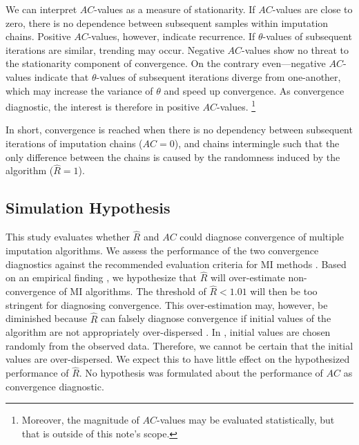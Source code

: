 \documentclass[article]{jss}
\begin{document}
We can interpret $AC$-values as a measure of stationarity. If $AC$-values are close to zero, there is no dependence between subsequent samples within imputation chains. Positive $AC$-values, however, indicate recurrence. If $\theta$-values of subsequent iterations are similar, trending may occur. Negative $AC$-values show no threat to the stationarity component of convergence. On the contrary even---negative $AC$-values indicate that $\theta$-values of subsequent iterations diverge from one-another, which may increase the variance of $\theta$ and speed up convergence. As convergence diagnostic, the interest is therefore in positive $AC$-values. 
\footnote{Moreover, the magnitude of $AC$-values may be evaluated statistically, but that is outside of this note's scope.}

In short, convergence is reached when there is no dependency between subsequent iterations of imputation chains ($AC = 0$), and chains intermingle such that the only difference between the chains is caused by the randomness induced by the algorithm ($\widehat{R} = 1$).

\subsection{Simulation Hypothesis} \label{sec:hypothesis}

This study evaluates whether $\widehat{R}$ and $AC$ could diagnose convergence of multiple imputation algorithms. We assess the performance of the two convergence diagnostics against the recommended evaluation criteria for MI methods \citep[i.e., average bias, average confidence interval width, and empirical coverage rate across simulations;][\S~2.5.2]{buur18}. %
Based on an empirical finding \citep{lace07}, we hypothesize that $\widehat{R}$ will over-estimate non-convergence of MI algorithms. The threshold of $\widehat{R} < 1.01$ will then be too stringent for diagnosing convergence. This over-estimation may, however, be diminished because $\widehat{R}$ can falsely diagnose convergence if initial values of the algorithm are not appropriately over-dispersed \cite[p~437]{broo98}. In , initial values are chosen randomly from the observed data. Therefore, we cannot be certain that the initial values are over-dispersed. We expect this to have little effect on the hypothesized performance of $\widehat{R}$. No hypothesis was formulated about the performance of $AC$ as convergence diagnostic.
\end{document}
